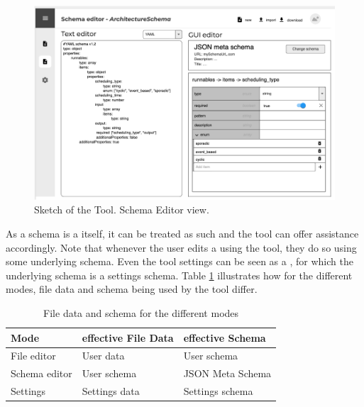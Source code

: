 \begin{figure}[!t]
    \includegraphics[width=\textwidth]{figures/mockup_gui_schema}
    \caption{Sketch of the Tool. Schema Editor view.}
    \label{mockup_gui_schema}
\end{figure}

As a schema is a \cfgfile{} itself, it can be treated as such and the tool can offer assistance accordingly.
Note that whenever the user edits a \cfgfile{} using the tool, they do so using some underlying schema.
Even the tool settings can be seen as a \cfgfile{}, for which the underlying schema is a settings schema.
Table \ref{tab:schema_and_file_data_by_mode} illustrates how for the different modes, file data and schema being used by the tool differ.
\begin{table}[]
\begin{tabular}{|l|l|l|}
\hline
\textbf{Mode} & \textbf{effective File Data} & \textbf{effective Schema} \\ \hline
File editor   & User data                    & User schema               \\ \hline
Schema editor & User schema                  & JSON Meta Schema          \\ \hline
Settings      & Settings data                & Settings schema           \\ \hline
\end{tabular}
\caption{File data and schema for the different modes}
\label{tab:schema_and_file_data_by_mode}
\end{table}


